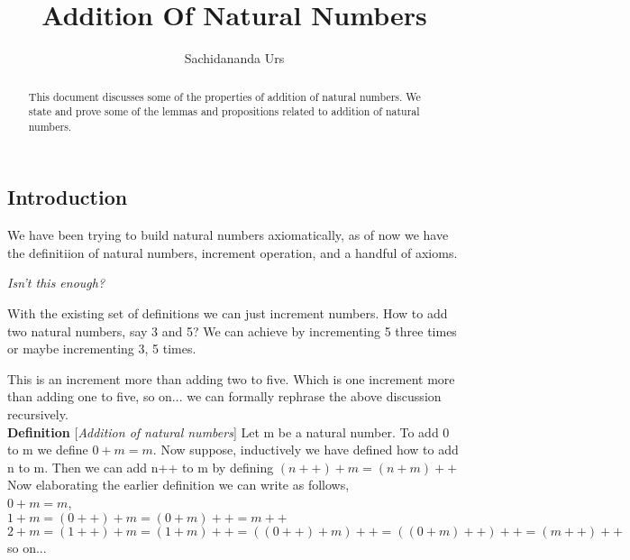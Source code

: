 \documentclass[10pt]{article}
\title {Addition Of Natural Numbers}
\author {Sachidananda Urs}
\begin{document}
\maketitle

\begin{abstract}
This document discusses some of the properties of addition of natural
numbers. We state and prove some of the lemmas and propositions related to
addition of natural numbers.
\end{abstract}

\subsection*{Introduction}
We have been trying to build natural numbers axiomatically, as of now we have
the definitiion of natural numbers, increment operation, and a handful of
axioms.

\emph{Isn't this enough?}

With the existing set of definitions we can just increment numbers. How to add
two natural numbers, say 3 and 5? We can achieve by incrementing 5 three times
or maybe incrementing 3, 5 times.

This is an increment more than adding two to five. Which is one increment more
than adding one to five, so on... we can formally rephrase the above discussion
recursively.
\\[4pt]

\textbf{Definition} [\emph{Addition of natural numbers}] Let m be a natural
number. To add 0 to m we define \(0 + m = m\). Now suppose, inductively we have
defined how to add n to m. Then we can add n++ to m by defining \( (n++) + m =
(n + m)++ \)
\\[4pt]
Now elaborating the earlier definition we can write as follows,
\\[4pt]
$ 0 + m = m $, \\
$ 1 + m = (0++) + m = (0 + m)++ = m++ $\\
$ 2 + m = (1++) + m = (1 + m)++ = ((0++) + m)++ = ((0 + m)++)++ = (m++)++ $\\
so on...
\end{document}
